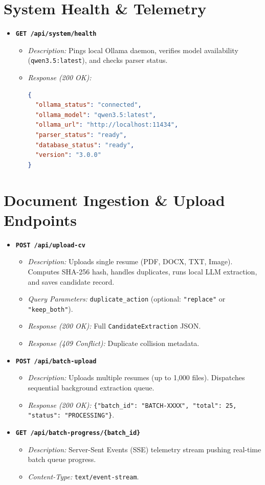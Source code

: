 \documentclass[11pt,a4paper]{report}
\begin{document}
\section{System Health \& Telemetry}
\begin{itemize}[leftmargin=1.5em]
    \item \textbf{\texttt{GET /api/system/health}}
    \begin{itemize}
        \item \emph{Description:} Pings local Ollama daemon, verifies model availability (\texttt{qwen3.5:latest}), and checks parser status.
        \item \emph{Response (200 OK):}
        \begin{lstlisting}[language=json]
{
  "ollama_status": "connected",
  "ollama_model": "qwen3.5:latest",
  "ollama_url": "http://localhost:11434",
  "parser_status": "ready",
  "database_status": "ready",
  "version": "3.0.0"
}
        \end{lstlisting}
    \end{itemize}
\end{itemize}

\section{Document Ingestion \& Upload Endpoints}
\begin{itemize}[leftmargin=1.5em]
    \item \textbf{\texttt{POST /api/upload-cv}}
    \begin{itemize}
        \item \emph{Description:} Uploads single resume (PDF, DOCX, TXT, Image). Computes SHA-256 hash, handles duplicates, runs local LLM extraction, and saves candidate record.
        \item \emph{Query Parameters:} \texttt{duplicate\_action} (optional: \texttt{"replace"} or \texttt{"keep\_both"}).
        \item \emph{Response (200 OK):} Full \texttt{CandidateExtraction} JSON.
        \item \emph{Response (409 Conflict):} Duplicate collision metadata.
    \end{itemize}
    \item \textbf{\texttt{POST /api/batch-upload}}
    \begin{itemize}
        \item \emph{Description:} Uploads multiple resumes (up to 1,000 files). Dispatches sequential background extraction queue.
        \item \emph{Response (200 OK):} \texttt{\{"batch\_id": "BATCH-XXXX", "total": 25, "status": "PROCESSING"\}}.
    \end{itemize}
    \item \textbf{\texttt{GET /api/batch-progress/\{batch\_id\}}}
    \begin{itemize}
        \item \emph{Description:} Server-Sent Events (SSE) telemetry stream pushing real-time batch queue progress.
        \item \emph{Content-Type:} \texttt{text/event-stream}.
    \end{itemize}
\end{itemize}
\end{document}
